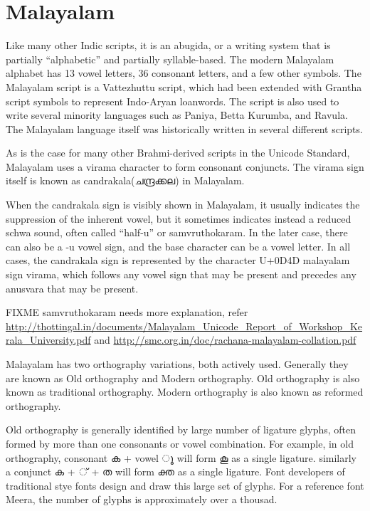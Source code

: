 \chapter{Malayalam}

Like many other Indic scripts, it is an abugida, or a writing system
that is partially “alphabetic” and partially syllable-based. The
modern Malayalam alphabet has 13 vowel letters, 36 consonant letters,
and a few other symbols. The Malayalam script is a Vattezhuttu script,
which had been extended with Grantha script symbols to represent
Indo-Aryan loanwords. The script is also used to write several
minority languages such as Paniya, Betta Kurumba, and Ravula. The
Malayalam language itself was historically written in several
different scripts.

As is the case for many other Brahmi-derived scripts in the Unicode
Standard, Malayalam uses a virama character to form consonant
conjuncts. The virama sign itself is known as candrakala(ചന്ദ്രക്കല) in
Malayalam.

When the candrakala sign is visibly shown in Malayalam, it usually
indicates the suppression of the inherent vowel, but it sometimes
indicates instead a reduced schwa sound, often called “half-u” or
samvruthokaram. In the later case, there can also be a -u vowel sign,
and the base character can be a vowel letter. In all cases, the
candrakala sign is represented by the character U+0D4D malayalam sign
virama, which follows any vowel sign that may be present and precedes
any anusvara that may be present.

FIXME samvruthokaram needs more explanation, refer
{\url{http://thottingal.in/documents/Malayalam_Unicode_Report_of_Workshop_Kerala_University.pdf}}
and {\url{http://smc.org.in/doc/rachana-malayalam-collation.pdf}}


Malayalam has two orthography variations, both actively
used. Generally they are known as Old orthography and Modern
orthography. Old orthography is also known as traditional
orthography. Modern orthography is also known as reformed orthography.

Old orthography is generally identified by large number of ligature
glyphs, often formed by more than one consonants or vowel
combination. For example, in old orthography, consonant {\meera ക} +
vowel { \meera ൂ} will form കൂ as a single ligature. similarly a
conjunct {\meera ക + ് + ത} will form {\meera ക്ത} as a single
ligature. Font developers of traditional stye fonts design and draw
this large set of glyphs. For a reference font Meera, the number of
glyphs is approximately over a thousad.

